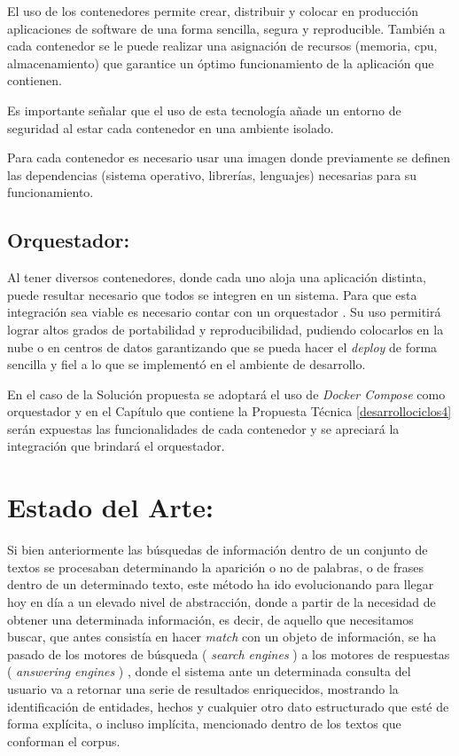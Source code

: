 \documentclass[
  10,
  openany]{book}
\begin{document}
El uso de los contenedores permite crear, distribuir y colocar en producción aplicaciones de software de una forma sencilla, segura y reproducible. También a cada contenedor se le puede realizar una asignación de recursos (memoria, cpu, almacenamiento) que garantice un óptimo funcionamiento de la aplicación que contienen.

Es importante señalar que el uso de esta tecnología añade un entorno de seguridad al estar cada contenedor en una ambiente isolado.

Para cada contenedor es necesario usar una imagen donde previamente se definen las dependencias (sistema operativo, librerías, lenguajes) necesarias para su funcionamiento.

\hypertarget{orquestador}{%
\subsection{Orquestador:}\label{orquestador}}

Al tener diversos contenedores, donde cada uno aloja una aplicación distinta, puede resultar necesario que todos se integren en un sistema. Para que esta integración sea viable es necesario contar con un orquestador \citep{cook2017}. Su uso permitirá lograr altos grados de portabilidad y reproducibilidad, pudiendo colocarlos en la nube o en centros de datos garantizando que se pueda hacer el \emph{deploy} de forma sencilla y fiel a lo que se implementó en el ambiente de desarrollo.

En el caso de la Solución propuesta se adoptará el uso de \emph{Docker Compose} como orquestador y en el Capítulo que contiene la Propuesta Técnica \ref{desarrollociclos4} serán expuestas las funcionalidades de cada contenedor y se apreciará la integración que brindará el orquestador.

\hypertarget{sota}{%
\section{Estado del Arte:}\label{sota}}

Si bien anteriormente las búsquedas de información dentro de un conjunto de textos se procesaban determinando la aparición o no de palabras, o de frases dentro de un determinado texto, este método ha ido evolucionando para llegar hoy en día a un elevado nivel de abstracción, donde a partir de la necesidad de obtener una determinada información, es decir, de aquello que necesitamos buscar, que antes consistía en hacer \emph{match} con un objeto de información, se ha pasado de los motores de búsqueda ( \emph{search engines} ) a los motores de respuestas ( \emph{answering engines} ) \citep{balog2018}, donde el sistema ante un determinada consulta del usuario va a retornar una serie de resultados enriquecidos, mostrando la identificación de entidades, hechos y cualquier otro dato estructurado que esté de forma explícita, o incluso implícita, mencionado dentro de los textos que conforman el corpus.
\end{document}

